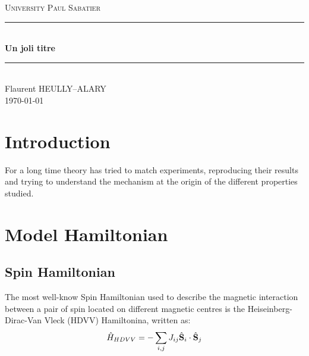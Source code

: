 \documentclass[12pt]{article}
\numberwithin{equation}{section}
\newcommand{\noun}[1]{\textsc{#1}}
\begin{document}

\begin{titlepage}
\newcommand{\HRule}{\rule{\linewidth}{0.5mm}}
\center
\textsc{\LARGE
University \noun{Paul Sabatier}
} \\[1cm]
\HRule\\[0.4cm]
{ \huge \bfseries Un joli titre \\[0.15cm] }
\HRule\\[1.5cm]
Flaurent HEULLY--ALARY
\\[1cm]
\today \\ [1cm]
\end{titlepage}
\begin{center}
\thispagestyle{plain}
\par\end{center}
\large
\tableofcontents
\newpage
\section{Introduction}
For a long time theory has tried to match experiments, reproducing their results and trying to understand the mechanism at the origin of the different properties studied.
\section{Model Hamiltonian}

\subsection{Spin Hamiltonian}

The most well-know Spin Hamiltonian used to describe the magnetic interaction between a pair of spin located on different magnetic centres is the Heiseinberg-Dirac-Van Vleck (HDVV) Hamiltonina, written as:
\begin{equation}\label{Hheis}
    \hat{H}_{HDVV}=-\sum_{i,j} J_{ij} \hat{\vb S}_i \cdot \hat{\vb S}_j
\end{equation}
\end{document}
